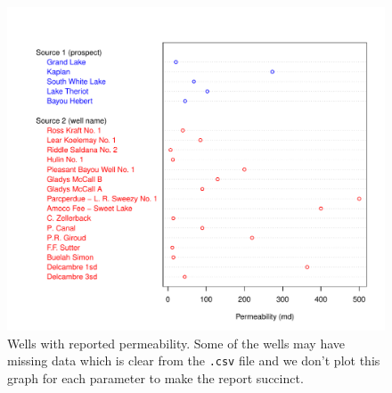 \documentclass[review,authoryear, 12pt]{elsarticle}\usepackage[]{graphicx}\usepackage[]{color}
\makeatletter
\def\maxwidth{ %
  \ifdim\Gin@nat@width>\linewidth
    \linewidth
  \else
    \Gin@nat@width
  \fi
}
\newenvironment{knitrout}{}{} %
\makeatother
\begin{document}
\begin{knitrout}
\color{fgcolor}\begin{figure}[]

\includegraphics[width=\maxwidth]{figure/PermDotChart} \caption[Wells with reported permeability]{Wells with reported permeability. Some of the wells may have missing data which is clear from the \texttt{.csv} file and we don't plot this graph for each parameter to make the report succinct.\label{Fig:PermDotChart}}
\end{figure}


\end{knitrout}
\end{document}
